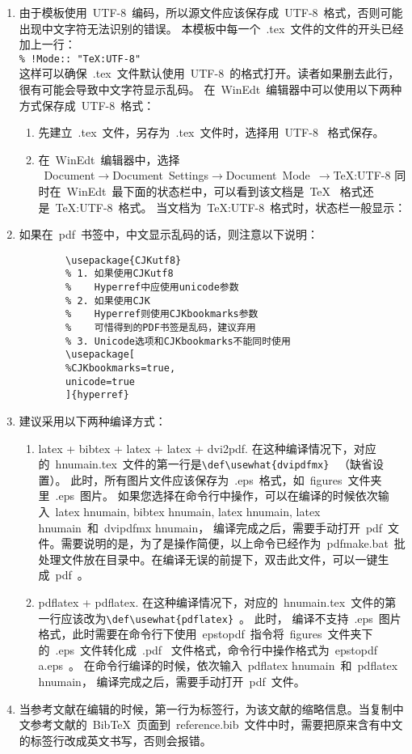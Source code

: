 \begin{enumerate}
  \item 由于模板使用~UTF-8~编码，所以源文件应该保存成~UTF-8~格式，否则可能出现中文字符无法识别的错误。
  本模板中每一个~.tex~文件的文件的开头已经加上一行：\\
  \verb|% !Mode:: "TeX:UTF-8"|\\
     这样可以确保~.tex~文件默认使用~UTF-8~的格式打开。读者如果删去此行，很有可能会导致中文字符显示乱码。
     在~WinEdt~编辑器中可以使用以下两种方式保存成~UTF-8~格式：
      \begin{enumerate}
        \item 先建立~.tex~文件，另存为~.tex~文件时，选择用~UTF-8~ 格式保存。
        \item
            在~WinEdt~编辑器中，选择\\
            \mbox{~Document$\rightarrow$Document Settings$\rightarrow$Document Mode $\rightarrow$TeX:UTF-8} 同时在~WinEdt~最下面的状态栏中，可以看到该文档是~TeX~ 格式还是~TeX:UTF-8~格式。
            当文档为~TeX:UTF-8~格式时，状态栏一般显示：
      \end{enumerate}
  \item 如果在~pdf~书签中，中文显示乱码的话，则注意以下说明：
    \begin{verbatim}
        \usepackage{CJKutf8}
        % 1. 如果使用CJKutf8
        %    Hyperref中应使用unicode参数
        % 2. 如果使用CJK
        %    Hyperref则使用CJKbookmarks参数
        %    可惜得到的PDF书签是乱码，建议弃用
        % 3. Unicode选项和CJKbookmarks不能同时使用
        \usepackage[
        %CJKbookmarks=true,
        unicode=true
        ]{hyperref}
     \end{verbatim}
  \item 建议采用以下两种编译方式：
  \begin{enumerate}
    \item latex + bibtex + latex + latex + dvi2pdf. 在这种编译情况下，对应的~hnumain.tex~文件的第一行是\verb|\def\usewhat{dvipdfmx}|~ （缺省设置）。 此时，所有图片文件应该保存为~.eps~格式，如~figures~文件夹里~.eps~图片。
          如果您选择在命令行中操作，可以在编译的时候依次输入~latex hnumain, bibtex hnumain, latex hnumain, latex hnumain~和~dvipdfmx hnumain， 编译完成之后，需要手动打开~pdf~文件。需要说明的是，为了是操作简便，以上命令已经作为~pdfmake.bat~批处理文件放在目录中。在编译无误的前提下，双击此文件，可以一键生成~pdf~。

    \item pdflatex + pdflatex. 在这种编译情况下，对应的~hnumain.tex~文件的第一行应该改为\verb|\def\usewhat{pdflatex}|~。 此时， 编译不支持~.eps~图片格式，此时需要在命令行下使用~epstopdf~指令将~figures~文件夹下 的~.eps~文件转化成~.pdf~ 文件格式，命令行中操作格式为~epstopdf a.eps~。
          在命令行编译的时候，依次输入~pdflatex hnumain~和~pdflatex hnumain， 编译完成之后，需要手动打开~pdf~文件。
  \end{enumerate}
    \item  当参考文献在编辑的时候，第一行为标签行，为该文献的缩略信息。当复制中文参考文献的~BibTeX~页面到~reference.bib~文件中时，需要把原来含有中文的标签行改成英文书写，否则会报错。
\end{enumerate}

